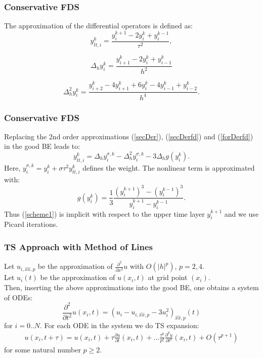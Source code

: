 \documentclass{beamer}
\newcommand{\be}{\begin{equation}}
\newcommand{\ee}{\end{equation}}
\newcommand{\rf}[1]{(\ref{#1})}
\begin{document}

\begin{frame}
\frametitle{Conservative FDS}
The approximation of the differential operators is defined as:
\begin{equation}\label{secDer}
y_{\bar{t}t,i}^k=\dfrac{y_i^{k+1}-2y_i^k+y_i^{k-1}}{\tau^2},
\end{equation}

\begin{equation}\label{secDerfd}
\Delta_h y_i^k=\dfrac{y_{i+1}^k-2y_i^k+y_{i-1}^k}{h^2}
\end{equation}

\begin{equation}\label{forDerfd}
\Delta_h^2 y_i^k=\dfrac{y_{i+2}^k-4y_{i+1}^k+6y_{i}^k-4y_{i-1}^k+y_{i-2}^k}{h^4}.
\end{equation}

\end{frame}


\begin{frame}
\frametitle{Conservative FDS}
Replacing the 2nd order approximations \rf{secDer}, \rf{secDerfd} and \rf{forDerfd} in the good BE leads to:
\begin{equation}\label{scheme1}
y_{\bar{t}t,i}^k=\Delta_h y_i^{\sigma,k}-\Delta_h^2 y_i^{\sigma,k} -3\Delta_h g(y_i^k).
\end{equation}
Here, $ y_i^{\sigma,k}= y_i^{k}+\sigma \tau^2 y_{\bar{t}t,i}^k$ defines the weight.
The nonlinear term is approximated with:
\begin{equation}\label{nonLin}
g(y_i^k) = \frac{1}{3} \frac{(y_i^{k+1})^3 - (y_i^{k-1})^3}{y_i^{k+1} - y_i^{k-1}}.
\end{equation}
Thus \rf{scheme1} is implicit with respect to the upper time layer $y_i^{k+1}$ and we use Picard iterations.
\end{frame}



\begin{frame}
\frametitle{TS Approach with Method of Lines}

Let $u_{i, \widehat{xx}, p}$ be the approximation of $\frac{\partial^2 }{\partial x^2} u$ with $O(|h|^p)$, $p=2,4$.
\\
Let $u_{i}(t)$ be the approximation of $u(x_i, t)$ at grid point $(x_i)$.
\\
Then, inserting the above approximations into the good BE, one obtains a system of ODEs:
\be \label{DiscreteEq}
\frac{\partial^2 }{\partial t^2}u(x_i, t)  =
(u_{i} - u_{i, \widehat{xx}, p} - 3u^2_{i})_{\widehat{xx}, p}(t)
\ee
for $i = 0..N$. For each ODE in the system we do TS expansion:
\begin{align} \label{TSe}
u(x_i, t+\tau) = u(x_i, t) + \tau \frac{ \partial u }{ \partial t }(x_i, t)  + ... 
\frac{ \tau^p }{ p! } \frac{ \partial^p u }{ \partial t^p }(x_i, t) + O(\tau^{p+1})
\end{align}
for some natural number $p \ge 2$.
\end{frame}
\end{document}

